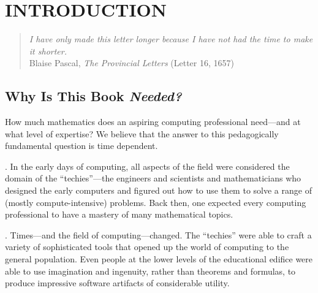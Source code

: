 
\chapter{INTRODUCTION}
\label{ch:intro}

\begin{quote}
{\em I have only made this letter longer because I have not had the
  time to make it shorter.}  \\
\hspace*{2in}Blaise Pascal, {\it The Provincial Letters}
(Letter 16, 1657)
\end{quote}


\section{Why Is This Book {\em Needed?}}
\label{sec:bookneeded}

How much mathematics does an aspiring computing professional
need---and at what level of expertise?  We believe that the answer to
this pedagogically fundamental question is time dependent.

\medskip

.
In the early days of computing, all aspects of the field were
considered the domain of the ``techies''---the engineers and
scientists and mathematicians who designed the early computers and
figured out how to use them to solve a range of (mostly
compute-intensive) problems.  Back then, one expected every computing
professional to have a mastery of many mathematical topics.

\medskip

.
Times---and the field of computing---changed.  The ``techies'' were
able to craft a variety of sophisticated tools that opened up the
world of computing to the general population.  Even people at the
lower levels of the educational edifice were able to use imagination
and ingenuity, rather than theorems and formulas, to produce
impressive software artifacts of considerable utility.

\medskip

